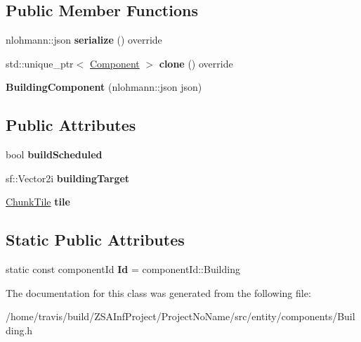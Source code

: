 \subsection*{Public Member Functions}
\begin{DoxyCompactItemize}
\item 
\hypertarget{classBuildingComponent_a93529cecf1291f9dfe5a184e78adbb12}{nlohmann\-::json {\bfseries serialize} () override}\label{classBuildingComponent_a93529cecf1291f9dfe5a184e78adbb12}

\item 
\hypertarget{classBuildingComponent_af15cd1de37045353c0058139cd32f429}{std\-::unique\-\_\-ptr$<$ \hyperlink{classComponent}{Component} $>$ {\bfseries clone} () override}\label{classBuildingComponent_af15cd1de37045353c0058139cd32f429}

\item 
\hypertarget{classBuildingComponent_ac22fa6cc4b98244fac56818e3beadada}{{\bfseries Building\-Component} (nlohmann\-::json json)}\label{classBuildingComponent_ac22fa6cc4b98244fac56818e3beadada}

\end{DoxyCompactItemize}
\subsection*{Public Attributes}
\begin{DoxyCompactItemize}
\item 
\hypertarget{classBuildingComponent_a104c5fdb062b2332bd3ad2270bb13350}{bool {\bfseries build\-Scheduled}}\label{classBuildingComponent_a104c5fdb062b2332bd3ad2270bb13350}

\item 
\hypertarget{classBuildingComponent_a03f07afb7c2c3ee9903c951ba53e9a7a}{sf\-::\-Vector2i {\bfseries building\-Target}}\label{classBuildingComponent_a03f07afb7c2c3ee9903c951ba53e9a7a}

\item 
\hypertarget{classBuildingComponent_a4659984cb113b08dddc6d8de8f388ad7}{\hyperlink{classChunkTile}{Chunk\-Tile} {\bfseries tile}}\label{classBuildingComponent_a4659984cb113b08dddc6d8de8f388ad7}

\end{DoxyCompactItemize}
\subsection*{Static Public Attributes}
\begin{DoxyCompactItemize}
\item 
\hypertarget{classBuildingComponent_afd1ba10127b5914c218ba60f6d3af08b}{static const component\-Id {\bfseries Id} = component\-Id\-::\-Building}\label{classBuildingComponent_afd1ba10127b5914c218ba60f6d3af08b}

\end{DoxyCompactItemize}


The documentation for this class was generated from the following file\-:\begin{DoxyCompactItemize}
\item 
/home/travis/build/\-Z\-S\-A\-Inf\-Project/\-Project\-No\-Name/src/entity/components/Building.\-h\end{DoxyCompactItemize}
